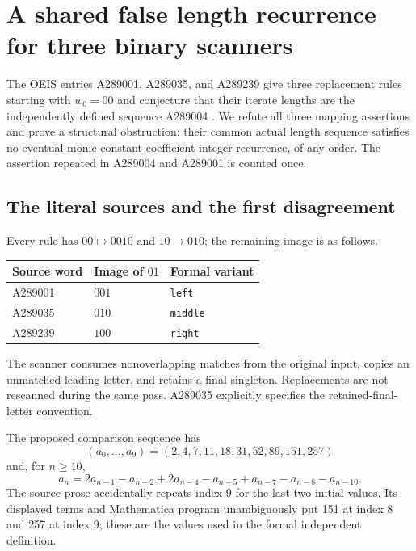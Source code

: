 \documentclass[11pt]{article}
\begin{document}
\section{A shared false length recurrence for three binary scanners}
\label{sec:a289004}

The OEIS entries A289001, A289035, and A289239 give three replacement rules
starting with $w_0=00$ and conjecture that their iterate lengths are the
independently defined sequence A289004
\cite{A289001,A289004,A289035,A289239}.
We refute all three mapping assertions and prove a structural obstruction:
their common actual length sequence satisfies no eventual monic
constant-coefficient integer recurrence, of any order.
The assertion repeated in A289004 and A289001 is counted once.

\subsection{The literal sources and the first disagreement}

Every rule has $00\mapsto0010$ and $10\mapsto010$; the remaining image is
as follows.
\begin{center}
\begin{tabular}{lll}
\hline
Source word & Image of $01$ & Formal variant\\
\hline
A289001 & $001$ & \texttt{left}\\
A289035 & $010$ & \texttt{middle}\\
A289239 & $100$ & \texttt{right}\\
\hline
\end{tabular}
\end{center}
The scanner consumes nonoverlapping matches from the original input, copies
an unmatched leading letter, and retains a final singleton. Replacements
are not rescanned during the same pass. A289035 explicitly specifies the
retained-final-letter convention.

The proposed comparison sequence has
\[
 (a_0,\ldots,a_9)=(2,4,7,11,18,31,52,89,151,257)
\]
and, for $n\ge10$,
\begin{equation}
 a_n=2a_{n-1}-a_{n-2}+2a_{n-4}-a_{n-5}
       +a_{n-7}-a_{n-8}-a_{n-10}.
 \label{eq:a289004:claimed}
\end{equation}
The source prose accidentally repeats index 9 for the last two initial
values. Its displayed terms and Mathematica program unambiguously put 151
at index 8 and 257 at index 9; these are the values used in the formal
independent definition.
\end{document}
